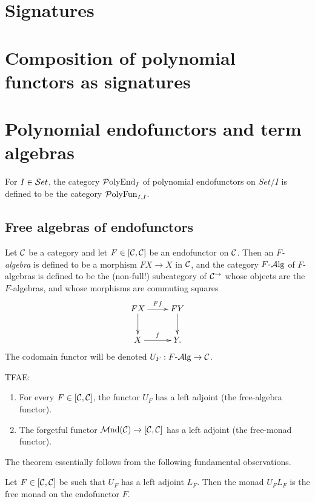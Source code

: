 \newcommand{\PolyEnd}{{\mathrm{\cP olyEnd}}}
\newcommand{\PolyFun}{{\mathrm{\cP olyFun}}}
\newcommand{\PolyMnd}{{\mathrm{\cP olyMnd}}}

\section{Signatures}
\section{Composition of polynomial functors as signatures}

\section{Polynomial endofunctors and term algebras}
For $I\in{\mathcal{S} et}$, the category $\PolyEnd_I$ of polynomial endofunctors on $Set/I$
is defined to be the category $\PolyFun_{I,I}$.

\subsection{Free algebras of endofunctors}
Let $\mathcal{C}$ be a category and let $F\in [\mathcal{C},\mathcal{C}]$ be an endofunctor on $\mathcal{C}$.
Then an \emph{$F$-algebra} is defined to be a morphism $FX\to X$ in $\mathcal{C}$, and
the category $F{\text{-} \mathrm{\mathcal{A} lg}}$ of $F$-algebras is defined to be the (non-full!) subcategory of
$\mathcal{C}^\rightarrow$ whose objects are the $F$-algebras, and whose morphisms are commuting
squares
\[
    \xymatrix{
      FX \ar[d]\ar[r]^{Ff}
      &FY\ar[d]\\
      X\ar[r]^f
      &Y.
    }
\]
The codomain functor will be denoted
$U_F:F{\text{-} \mathrm{\mathcal{A} lg}}\to\mathcal{C}$.

\begin{theorem} \label{thm:free-monad}
    TFAE:
    \begin{enumerate}
    \item For every $F\in[\mathcal{C},\mathcal{C}]$, the functor $U_F$ has a left adjoint (the
        free-algebra functor).
    \item The forgetful functor ${\mathrm{\mathcal{M} nd}}(\mathcal{C})\to[\mathcal{C},\mathcal{C}]$ has a left adjoint (the
        free-monad functor).
    \end{enumerate}
\end{theorem}

The theorem essentially follows from the following fundamental observations.
\begin{proposition}
    Let $F\in\left[\mathcal{C},\mathcal{C}\right]$ be such that $U_F$ has a left adjoint $L_F$. Then the
    monad $U_FL_F$ is the free monad on the endofunctor $F$.
\end{proposition}

